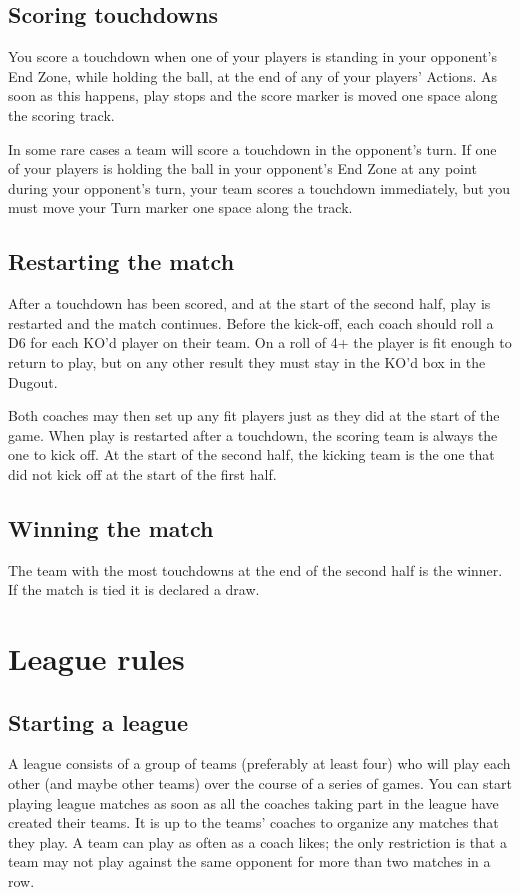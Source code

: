 \documentclass{article}
\begin{document}
\begin{multicols}{2}
\subsection{Scoring touchdowns}
\par You score a touchdown when one of your players is standing in your opponent's End Zone, while holding the ball, at the end of any of your players' Actions. As soon as this happens, play stops and the score marker is moved one space along the scoring track.
\par In some rare cases a team will score a touchdown in the opponent's turn. If one of your players is holding the ball in your opponent's End Zone at any point during your opponent's turn, your team scores a touchdown immediately, but you must move your Turn marker one space along the track.

\subsection{Restarting the match}
\par After a touchdown has been scored, and at the start of the second half, play is restarted and the match continues. Before the kick-off, each coach should roll a D6 for each KO'd player on their team. On a roll of 4+ the player is fit enough to return to play, but on any other result they must stay in the KO'd box in the Dugout.
\par Both coaches may then set up any fit players just as they did at the start of the game. When play is restarted after a touchdown, the scoring team is always the one to kick off. At the start of the second half, the kicking team is the one that did not kick off at the start of the first half.

\subsection{Winning the match}
\par The team with the most touchdowns at the end of the second half is the winner. If the match is tied it is declared a draw.

\section{League rules}

\subsection{Starting a league}
\par A league consists of a group of teams (preferably at least four) who will play each other (and maybe other teams) over the course of a series of games. You can start playing league matches as soon as all the coaches taking part in the league have created their teams. It is up to the teams' coaches to organize any matches that they play. A team can play as often as a coach likes; the only restriction is that a team may not play against the same opponent for more than two matches in a row.


\end{multicols}
\end{document}

